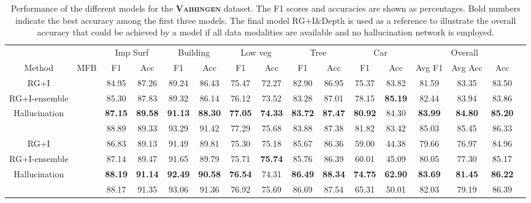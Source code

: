 \documentclass[journal]{IEEEtran}
\newcommand{\cmark}{\ding{51}}%
\newcommand{\xmark}{\ding{55}}%
\begin{document}
\begin{table*}[t]
\begin{center}
\begin{tabular}{lc|c|c|c|c|c|c|c|c|c|c|c|c|c|c|}
\cline{3-15}
 & & \multicolumn{2}{|c|}{Imp Surf} & \multicolumn{2}{c|}{Building} & \multicolumn{2}{c|}{Low veg} & \multicolumn{2}{c|}{Tree} & \multicolumn{2}{c|}{Car} & \multicolumn{3}{c|}{Overall}\\
\cline{1-15}
\multicolumn{1}{|c|}{Method} & \multicolumn{1}{|c|}{MFB} & F1 & Acc & F1 & Acc & F1 & Acc & F1 & Acc & F1 & Acc & Avg F1 & Avg Acc & Acc\\
\cline{1-15} 
\multicolumn{1}{|c|}{RG+I} & \cmark & 84.95 & 87.26 & 89.24 & 86.43 & 75.47 & 72.27 & 82.90 & 86.95 & 75.37 & 83.82 & 81.59 & 83.35 & 83.50\\
\cline{2-15}
\multicolumn{1}{|c|}{RG+I-ensemble} & \cmark & 85.30 & 87.83 & 89.32 & 86.14 & 76.12 & 73.52 & 83.28 & 87.01 & 78.15 & {\bf85.19} & 82.44 & 83.94 & 83.86 \\
\cline{2-15}
\multicolumn{1}{|c|}{Hallucination} & \cmark & {\bf87.15} & {\bf89.58} & {\bf91.13} & {\bf88.30} & {\bf77.05} & {\bf74.33} & {\bf83.72} & {\bf87.47} & {\bf80.92} & 84.30 & {\bf83.99} & {\bf84.80} & {\bf85.20} \\
\hdashline
\multicolumn{1}{|c|}{RG+I\&Depth} & \cmark & 88.89 & 89.33 & 93.29 & 91.42 & 77.29 & 75.68 & 83.88 & 87.38 & 81.82 & 83.42 & 85.03 & 85.45 & 86.33 \\
\hline
\hline
\multicolumn{1}{|c|}{RG+I} & \xmark & 86.83 & 89.13 & 91.49 & 89.81 & 75.30 & 75.18 & 85.67 & 86.36 & 59.00 & 44.38 & 79.66 & 76.97 & 84.96\\
\hline
\multicolumn{1}{|c|}{RG+I-ensemble} & \xmark & 87.14 & 89.47 & 91.65 & 89.79 & 75.71 & {\bf75.74} & 85.76 & 86.39 & 60.01 & 45.09 & 80.05 & 77.30 & 85.17 \\
\hline
\multicolumn{1}{|c|}{Hallucination} & \xmark & {\bf88.19} & {\bf91.14} & {\bf92.49} & {\bf90.58} & {\bf76.54} & 74.31 & {\bf86.49} & {\bf88.34} & {\bf74.75} & {\bf62.90} & {\bf83.69} & {\bf81.45} & {\bf86.22}\\
\hdashline
\multicolumn{1}{|c|}{RG+I\&Depth} & \xmark & 88.17 & 91.35 & 93.06 & 91.36 & 76.92 & 75.69 & 86.69 & 87.54 & 65.31 & 50.01 & 82.03 & 79.19 & 86.39\\
\hline
\end{tabular}
\vspace{0.2cm}
\caption{Performance of the different models for the {\bf\scshape Vaihingen} dataset. The F1 scores and accuracies are shown as percentages. Bold numbers indicate the best accuracy among the first three models. The final model $\text{RG+I\&Depth}$ is used as a reference to illustrate the overall accuracy that could be achieved by a model if all data modalities are available and no hallucination network is employed.}
\label{tab:resultsMFBVaihingen}
\end{center}
\end{table*}
\end{document}
